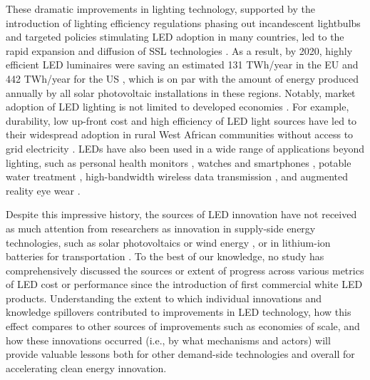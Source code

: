 \documentclass[journal=jacsat,manuscript=article]{achemso}
\begin{document}
These  dramatic improvements in lighting technology, supported by the introduction of lighting efficiency regulations phasing out incandescent lightbulbs and targeted policies stimulating LED adoption in many countries, led to the rapid expansion and diffusion of SSL technologies  \cite{weinold2020long}\cite{Mills2014}\cite{Stegmaier2021}\cite{grubb2021new}. As a result, by 2020, highly efficient LED luminaires were saving an estimated 131 TWh/year in the EU \cite{eu2019impactass} and 442 TWh/year for the US \cite{guidehouse2020adoption}, which is on par with the amount of energy produced annually by all solar photovoltaic installations in these regions. Notably, market adoption of LED lighting is not limited to developed economies \cite{Kamat2020}. For example, durability, low up-front cost and high efficiency of LED light sources have led to their widespread adoption in rural West African communities without access to grid electricity \cite{Bensch2017}. LEDs have also been used in a wide range of applications beyond lighting, such as personal health monitors \cite{o2019optical}\cite{Wyatt2020}, watches and smartphones \cite{Bai2017}, potable water treatment \cite{Lui2014}, high-bandwidth wireless data transmission \cite{Haas2016}, and augmented reality eye wear \cite{Lee2016}. 

Despite this impressive history, the sources of LED innovation have not received as much attention from researchers as innovation in supply-side  energy technologies, such as solar photovoltaics  \cite{kavlak2018evaluating} or wind energy \cite{qiu2012price}\cite{jennings2020policy}, or in lithium-ion batteries for transportation \cite{Ziegler2021}\cite{Stephan2021}. To the best of our knowledge, no study has comprehensively discussed the sources or extent of progress across various metrics of LED cost or performance since the introduction of first commercial white LED products.  Understanding the extent to which individual innovations and knowledge spillovers  contributed to improvements in LED technology, how this effect compares to other sources of improvements such as economies of scale, and how these innovations occurred (i.e., by what mechanisms and actors) will provide valuable lessons both for other demand-side technologies and overall for accelerating clean energy innovation.
\end{document}

